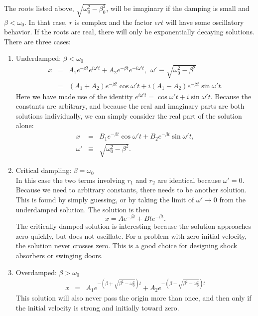 The roots listed above, $\sqrt{\omega_0^2-\beta_0^2}$, will be imaginary if the damping  is small and $\beta<\omega_0$. In that case, $r$ is complex and the factor $e{rt}$ will have some oscillatory behavior. If the roots are real, there will only be exponentially decaying solutions. There are three cases:
\begin{enumerate}\itemsep 0pt
\item Underdamped: $\beta<\omega_0$
\begin{eqnarray}
x&=&A_1e^{-\beta t}e^{i\omega't}+A_2e^{-\beta t}e^{-i\omega't},~~\omega'\equiv\sqrt{\omega_0^2-\beta^2}\\
\nonumber
&=&(A_1+A_2)e^{-\beta t}\cos\omega't+i(A_1-A_2)e^{-\beta t}\sin\omega't.
\end{eqnarray}
Here we have made use of the identity $e^{i\omega't}=\cos\omega't+i\sin\omega't$. Because the constants are arbitrary, and because the real and imaginary parts are both solutions individually, we can simply consider the real part of the solution alone:
\begin{eqnarray}
\label{eq:homogsolution}
x&=&B_1e^{-\beta t}\cos\omega't+B_2e^{-\beta t}\sin\omega't,\\
\nonumber 
\omega'&\equiv&\sqrt{\omega_0^2-\beta^2}.
\end{eqnarray}

\item Critical dampling: $\beta=\omega_0$\\
In this case the two terms involving $r_1$ and $r_2$ are identical because $\omega'=0$. Because we need to arbitrary constants, there needs to be another solution. This is found by simply guessing, or by taking the limit of $\omega'\rightarrow 0$ from the underdamped solution. The solution is then
\begin{equation}
\label{eq:criticallydamped}
x=Ae^{-\beta t}+Bte^{-\beta t}.
\end{equation}
The critically damped solution is interesting because the solution approaches zero quickly, but does not oscillate. For a problem with zero initial velocity, the solution never crosses zero. This is a good choice for designing shock absorbers or swinging doors.
\item Overdamped: $\beta>\omega_0$
\begin{eqnarray}
x&=&A_1e^{-(\beta+\sqrt{\beta^2-\omega_0^2})t}+A_2e^{-(\beta-\sqrt{\beta^2-\omega_0^2})t}
\end{eqnarray}
This solution will also never pass the origin more than once, and then only if the initial velocity is strong and initially toward zero.
\end{enumerate}

